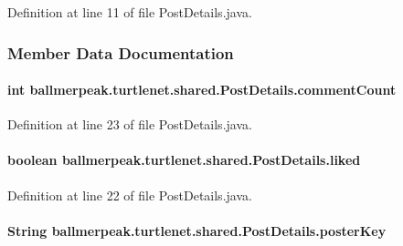 Definition at line 11 of file Post\-Details.\-java.



\subsubsection{Member Data Documentation}
\hypertarget{classballmerpeak_1_1turtlenet_1_1shared_1_1PostDetails_a24553cdb518e4501cbdf63263c21d1a0}{
\paragraph[{comment\-Count}]{\setlength{\rightskip}{0pt plus 5cm}int ballmerpeak.\-turtlenet.\-shared.\-Post\-Details.\-comment\-Count}}\label{classballmerpeak_1_1turtlenet_1_1shared_1_1PostDetails_a24553cdb518e4501cbdf63263c21d1a0}


Definition at line 23 of file Post\-Details.\-java.

\hypertarget{classballmerpeak_1_1turtlenet_1_1shared_1_1PostDetails_aea0cbf8b30b582800479e28eeb1e931f}{
\paragraph[{liked}]{\setlength{\rightskip}{0pt plus 5cm}boolean ballmerpeak.\-turtlenet.\-shared.\-Post\-Details.\-liked}}\label{classballmerpeak_1_1turtlenet_1_1shared_1_1PostDetails_aea0cbf8b30b582800479e28eeb1e931f}


Definition at line 22 of file Post\-Details.\-java.

\hypertarget{classballmerpeak_1_1turtlenet_1_1shared_1_1PostDetails_a01a466200c299cca8b1cefabb10973d7}{
\paragraph[{poster\-Key}]{\setlength{\rightskip}{0pt plus 5cm}String ballmerpeak.\-turtlenet.\-shared.\-Post\-Details.\-poster\-Key}}\label{classballmerpeak_1_1turtlenet_1_1shared_1_1PostDetails_a01a466200c299cca8b1cefabb10973d7}


